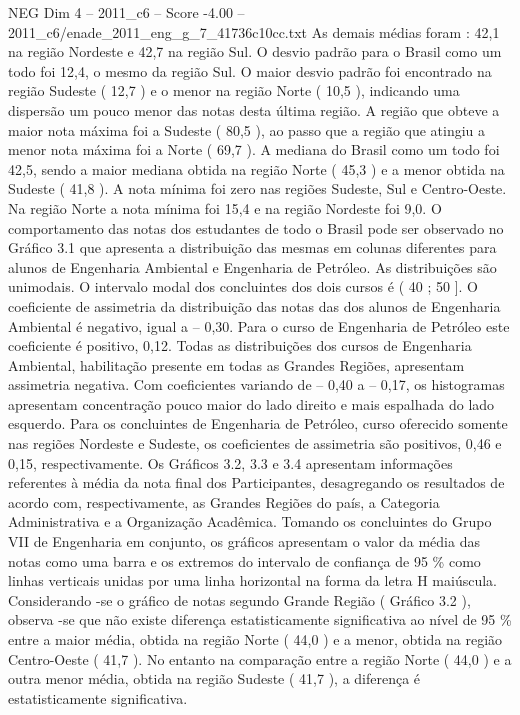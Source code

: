 \begin{textsample}{NEG Dim 4 – 2011\_c6 – Score -4.00 – 2011\_c6/enade\_2011\_eng\_g\_7\_41736c10cc.txt}
As demais médias foram : 42,1 na região Nordeste e 42,7 na região Sul.
O desvio padrão para o Brasil como um todo foi 12,4, o mesmo da região Sul.
O maior desvio padrão foi encontrado na região Sudeste ( 12,7 ) e o menor na região Norte ( 10,5 ), indicando uma dispersão um pouco menor das notas desta última região.
A região que obteve a maior nota máxima foi a Sudeste ( 80,5 ), ao passo que a região que atingiu a menor nota máxima foi a Norte ( 69,7 ).
A mediana do Brasil como um todo foi 42,5, sendo a maior mediana obtida na região Norte ( 45,3 ) e a menor obtida na Sudeste ( 41,8 ).
A nota mínima foi zero nas regiões Sudeste, Sul e Centro-Oeste.
Na região Norte a nota mínima foi 15,4 e na região Nordeste foi 9,0.
O comportamento das notas dos estudantes de todo o Brasil pode ser observado no Gráfico 3.1 que apresenta a distribuição das mesmas em colunas diferentes para alunos de Engenharia Ambiental e Engenharia de Petróleo.
As distribuições são unimodais.
O intervalo modal dos concluintes dos dois cursos é ( 40 ; 50 ].
O coeficiente de assimetria da distribuição das notas das dos alunos de Engenharia Ambiental é negativo, igual a – 0,30.
Para o curso de Engenharia de Petróleo este coeficiente é positivo, 0,12.
Todas as distribuições dos cursos de Engenharia Ambiental, habilitação presente em todas as Grandes Regiões, apresentam assimetria negativa.
Com coeficientes variando de – 0,40 a – 0,17, os histogramas apresentam concentração pouco maior do lado direito e mais espalhada do lado esquerdo.
Para os concluintes de Engenharia de Petróleo, curso oferecido somente nas regiões Nordeste e Sudeste, os coeficientes de assimetria são positivos, 0,46 e 0,15, respectivamente.
Os Gráficos 3.2, 3.3 e 3.4 apresentam informações referentes à média da nota final dos Participantes, desagregando os resultados de acordo com, respectivamente, as Grandes Regiões do país, a Categoria Administrativa e a Organização Acadêmica.
Tomando os concluintes do Grupo VII de Engenharia em conjunto, os gráficos apresentam o valor da média das notas como uma barra e os extremos do intervalo de confiança de 95 \% como linhas verticais unidas por uma linha horizontal na forma da letra H maiúscula.
Considerando -se o gráfico de notas segundo Grande Região ( Gráfico 3.2 ), observa -se que não existe diferença estatisticamente significativa ao nível de 95 \% entre a maior média, obtida na região Norte ( 44,0 ) e a menor, obtida na região Centro-Oeste ( 41,7 ).
No entanto na comparação entre a região Norte ( 44,0 ) e a outra menor média, obtida na região Sudeste ( 41,7 ), a diferença é estatisticamente significativa.

\end{textsample}
